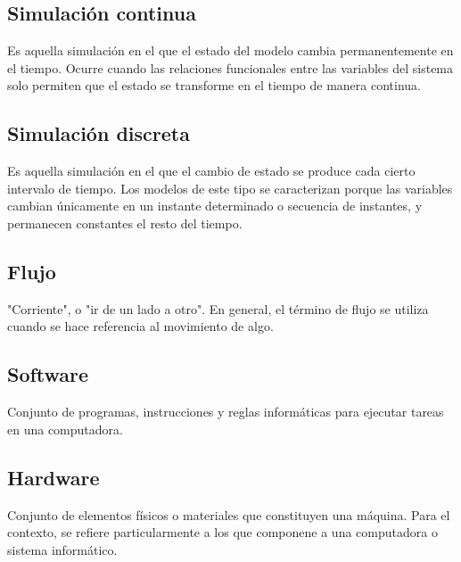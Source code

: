 \subsection{Simulación continua}
Es aquella simulación en el que el estado del modelo cambia permanentemente en el tiempo. Ocurre cuando las relaciones funcionales entre las variables del sistema solo permiten que el estado se transforme en el tiempo de manera continua.


\subsection{Simulación discreta}
Es aquella simulación en el que el cambio de estado se produce cada cierto intervalo de tiempo. Los modelos de este tipo se caracterizan porque las variables cambian únicamente en un instante determinado o secuencia de instantes, y permanecen constantes el resto del tiempo.


\subsection{Flujo}
"Corriente", o "ir de un lado a otro". En general, el término de flujo se utiliza cuando se hace referencia al movimiento de algo.


\subsection{Software}
Conjunto de programas, instrucciones y reglas informáticas para ejecutar tareas en una computadora.


\subsection{Hardware}
Conjunto de elementos físicos o materiales que constituyen una máquina. Para el contexto, se refiere particularmente a los que componene a una computadora o sistema informático.

